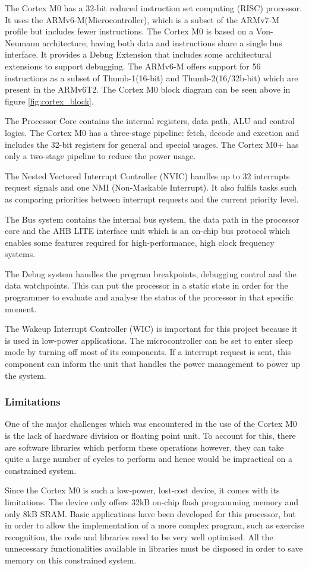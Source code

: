 The Cortex M0 has a 32-bit reduced instruction set computing (RISC) processor. It uses the ARMv6-M(Microcontroller), which is a subset of the ARMv7-M profile but includes fewer instructions. The Cortex M0 is based on a Von-Neumann architecture, having both data and instructions share a single bus interface. It provides a Debug Extension that includes some architectural extensions to support debugging. The ARMv6-M offers support for 56 instructions as a subset of  Thumb-1(16-bit) and Thumb-2(16/32b-bit) which are present in the ARMv6T2. The Cortex M0 block diagram can be seen above in figure \ref{fig:cortex_block}. 

The Processor Core contains the internal registers, data path, ALU and control logics. The Cortex M0 has a three-stage pipeline: fetch, decode and exection and includes the 32-bit registers for general and special usages. The Cortex M0+ has only a two-stage pipeline to reduce the power usage.

The Nested Vectored Interrupt Controller (NVIC) handles up to 32 interrupts request signals and one NMI (Non-Maskable Interrupt). It also fulfils tasks such as comparing priorities between  interrupt requests and the current priority level. 

The Bus system contains the internal bus system, the data path in the processor core and the AHB LITE interface unit which is an on-chip bus protocol which enables some features required for high-performance, high clock frequency systems. 

The Debug system handles the program breakpoints, debugging control and the data watchpoints. This can put the processor in a  static state in order for the programmer to evaluate and analyse the status of the processor in that specific moment.

The Wakeup Interrupt Controller (WIC) is important for this project because it is used in low-power applications. The microcontroller can be set to enter sleep mode by turning off most of its components. If a interrupt request is sent, this component can inform the unit that handles the power management to power up the system.

\subsubsection{Limitations \label{sec:cortex-limitations}}

One of the major challenges which was encountered in the use of the Cortex M0 is the lack of hardware division or floating point unit. To account for this, there are software libraries which perform these operations however, they can take quite a large number of cycles to perform and hence would be impractical on a constrained system.

Since the Cortex M0 is such a low-power, lost-cost device, it comes with its limitations. The device only offers 32kB on-chip flash programming memory and only 8kB SRAM. Basic applications have been developed for this processor, but in order to allow the implementation of a more complex program, such as exercise recognition, the code and libraries need to be very well optimised. All the unnecessary functionalities available in libraries must be disposed in order to save memory on this constrained system.
